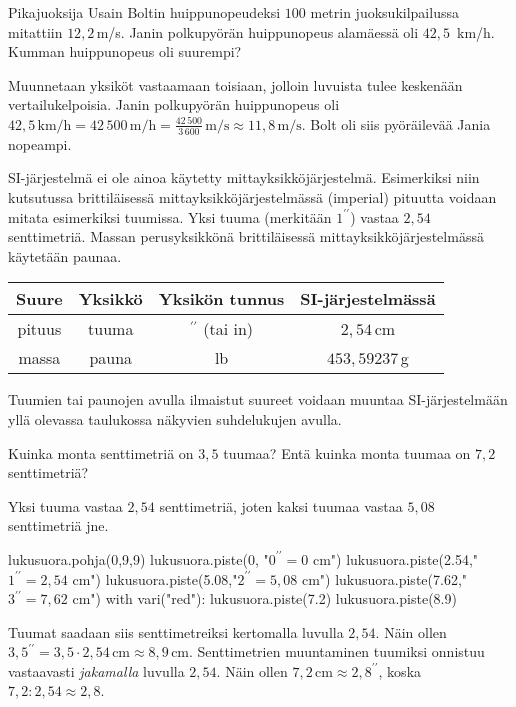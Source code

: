 \begin{esimerkki}
Pikajuoksija Usain Boltin huippunopeudeksi $100$ metrin juoksukilpailussa mitattiin $12,2$\,m/s. Janin polkupyörän huippunopeus alamäessä oli $42,5$\, km/h. Kumman huippunopeus oli suurempi?

\begin{esimratk}
Muunnetaan yksiköt vastaamaan toisiaan, jolloin luvuista tulee keskenään vertailukelpoisia. Janin polkupyörän huippunopeus oli $42,5\,\textrm{km/h} = 42\,500\,\textrm{m/h} = \frac{42\,500}{3\,600}\,\textrm{m/s} \approx 11,8\,\textrm{m/s}$. Bolt oli siis pyöräilevää Jania nopeampi.
\end{esimratk}
\end{esimerkki}

SI-järjestelmä ei ole ainoa käytetty mittayksikköjärjestelmä. Esimerkiksi niin kutsutussa brittiläisessä mittayksikköjärjestelmässä (imperial) pituutta voidaan mitata esimerkiksi tuumissa. Yksi tuuma (merkitään $1^{\prime \prime}$) vastaa $2,54$ senttimetriä. Massan perusyksikkönä brittiläisessä mittayksikköjärjestelmässä käytetään paunaa. %

\begin{tabular}{c|c|c|c}
Suure & Yksikkö & Yksikön tunnus & SI-järjestelmässä\\
\hline
pituus & tuuma & $^{\prime \prime}$ (tai in) & $2,54$\,cm \\
massa & pauna & lb & $453,59237$\,g \\
\end{tabular}

Tuumien tai paunojen avulla ilmaistut suureet voidaan muuntaa SI-järjestelmään yllä olevassa taulukossa näkyvien suhdelukujen avulla.

\begin{esimerkki}
Kuinka monta senttimetriä on $3,5$ tuumaa? Entä kuinka monta tuumaa on $7,2$ senttimetriä?

	\begin{esimratk}
Yksi tuuma vastaa $2,54$ senttimetriä, joten kaksi tuumaa vastaa $5,08$ senttimetriä jne.
	
\begin{kuva}
	lukusuora.pohja(0,9,9)
	lukusuora.piste(0, "$0^{\prime \prime} = 0 $ cm")
	lukusuora.piste(2.54,"$1^{\prime \prime} = 2,54$ cm")
	lukusuora.piste(5.08,"$2^{\prime \prime} = 5,08$ cm")
	lukusuora.piste(7.62,"$3^{\prime \prime} = 7,62$ cm")
	with vari("red"):
	  lukusuora.piste(7.2)
	  lukusuora.piste(8.9)
\end{kuva}

Tuumat saadaan siis senttimetreiksi kertomalla luvulla $2,54$. Näin ollen $3,5^{\prime \prime} = 3,5 \cdot 2,54\,\textrm{cm} \approx 8,9\,$cm. Senttimetrien muuntaminen tuumiksi onnistuu vastaavasti \emph{jakamalla} luvulla $2,54$. Näin ollen $7,2\,\textrm{cm} \approx 2,8^{\prime \prime}$, koska $7,2:2,54 \approx 2,8$.
	\end{esimratk}
\end{esimerkki}

